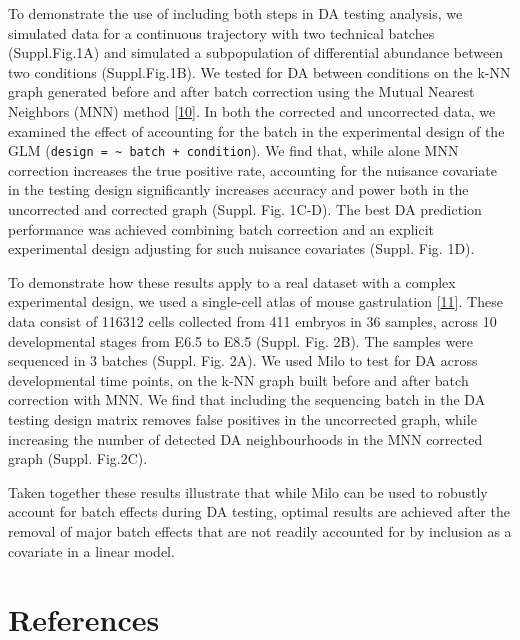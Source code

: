 \documentclass[
]{article}
\begin{document}
To demonstrate the use of including both steps in DA testing analysis, we simulated data for a continuous trajectory with two technical batches (Suppl.Fig.1A) and simulated a subpopulation of differential abundance between two conditions (Suppl.Fig.1B). We tested for DA between conditions on the k-NN graph generated before and after batch correction using the Mutual Nearest Neighbors (MNN) method {[}\protect\hyperlink{ref-haghverdiBatchEffectsSinglecell2018}{10}{]}. In both the corrected and uncorrected data, we examined the effect of accounting for the batch in the experimental design of the GLM (\texttt{design\ =\ \textasciitilde{}\ batch\ +\ condition}). We find that, while alone MNN correction increases the true positive rate, accounting for the nuisance covariate in the testing design significantly increases accuracy and power both in the uncorrected and corrected graph (Suppl. Fig. 1C-D). The best DA prediction performance was achieved combining batch correction and an explicit experimental design adjusting for such nuisance covariates (Suppl. Fig. 1D).

To demonstrate how these results apply to a real dataset with a complex experimental design, we used a single-cell atlas of mouse gastrulation {[}\protect\hyperlink{ref-pijuan-salaSinglecellMolecularMap2019}{11}{]}. These data consist of 116312 cells collected from 411 embryos in 36 samples, across 10 developmental stages from E6.5 to E8.5 (Suppl. Fig. 2B). The samples were sequenced in 3 batches (Suppl. Fig. 2A). We used Milo to test for DA across developmental time points, on the k-NN graph built before and after batch correction with MNN. We find that including the sequencing batch in the DA testing design matrix removes false positives in the uncorrected graph, while increasing the number of detected DA neighbourhoods in the MNN corrected graph (Suppl. Fig.2C).

Taken together these results illustrate that while Milo can be used to robustly account for batch effects during DA testing, optimal results are achieved after the removal of major batch effects that are not readily accounted for by inclusion as a covariate in a linear model.

\hypertarget{references}{%
\section*{References}\label{references}}
\end{document}
